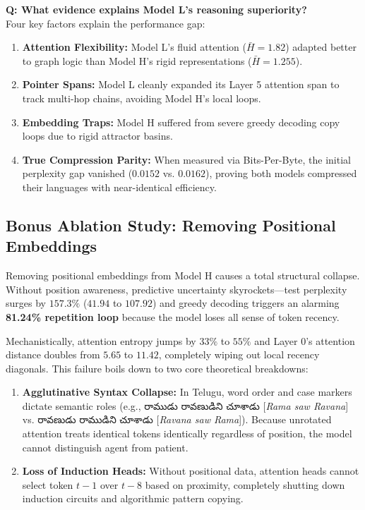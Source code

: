 \documentclass[8pt]{article}
\newcommand{\telugu}[1]{{\telugufont #1}}
\begin{document}
\vspace{0.5em}
\noindent\textbf{Q: What evidence explains Model L's reasoning superiority?} \\
Four key factors explain the performance gap:
\begin{enumerate}
    \item \textbf{Attention Flexibility:} Model L's fluid attention ($\bar{H} = 1.82$) adapted better to graph logic than Model H's rigid representations ($\bar{H} = 1.255$).
    \item \textbf{Pointer Spans:} Model L cleanly expanded its Layer 5 attention span to track multi-hop chains, avoiding Model H's local loops.
    \item \textbf{Embedding Traps:} Model H suffered from severe greedy decoding copy loops due to rigid attractor basins.
    \item \textbf{True Compression Parity:} When measured via Bits-Per-Byte, the initial perplexity gap vanished ($0.0152$ vs. $0.0162$), proving both models compressed their languages with near-identical efficiency.
\end{enumerate}


\subsection{Bonus Ablation Study: Removing Positional Embeddings}
\label{sec:bonus_ablation}

Removing positional embeddings from Model H causes a total structural collapse. Without position awareness, predictive uncertainty skyrockets—test perplexity surges by $157.3\%$ ($41.94$ to $107.92$) and greedy decoding triggers an alarming \textbf{81.24\% repetition loop} because the model loses all sense of token recency. 

Mechanistically, attention entropy jumps by $33\%$ to $55\%$ and Layer 0's attention distance doubles from $5.65$ to $11.42$, completely wiping out local recency diagonals. This failure boils down to two core theoretical breakdowns:
\begin{enumerate}
    \item \textbf{Agglutinative Syntax Collapse:} In Telugu, word order and case markers dictate semantic roles (e.g., \telugu{రాముడు రావణుడిని చూశాడు} [\textit{Rama saw Ravana}] vs. \telugu{రావణుడు రాముడిని చూశాడు} [\textit{Ravana saw Rama}]). Because unrotated attention treats identical tokens identically regardless of position, the model cannot distinguish agent from patient.
    \item \textbf{Loss of Induction Heads:} Without positional data, attention heads cannot select token $t-1$ over $t-8$ based on proximity, completely shutting down induction circuits and algorithmic pattern copying.
\end{enumerate}
\end{document}
